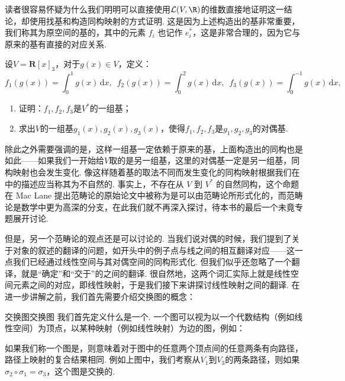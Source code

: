 读者很容易怀疑为什么我们明明可以直接使用$\mathcal{L}(V, \R)$的维数直接地证明这一结论，却使用找基和构造同构映射的方式证明. 这是因为上述构造出的基非常重要，我们称其为原空间的基的，其中的元素 $f_i$ 也记作 $e^*_i$，这是非常合理的，因为它与原来的基有直接的对应关系.

\begin{example}{}{}
    设$V=\mathbf{R}[x]_3$，对于$g(x)\in V$，定义：
    \[f_1(g(x))=\displaystyle\int_0^1g(x)\,\mathrm{d}x,\enspace f_2(g(x))=\int_0^2g(x)\,\mathrm{d}x,\enspace f_3(g(x))=\int_0^{-1}g(x)\,\mathrm{d}x,\]
    \begin{enumerate}
        \item 证明：$f_1,f_2,f_3$是$V^*$的一组基；

        \item 求出$V$的一组基$g_1(x),g_2(x),g_3(x)$，使得$f_1,f_2,f_3$是$g_1,g_2,g_3$的对偶基.
    \end{enumerate}
\end{example}

\begin{solution}

\end{solution}

除此之外需要强调的是，这样一组基一定依赖于原来的基，上面构造出的同构也是如此——如果我们一开始给$V$取的是另一组基，这里的对偶基一定是另一组基，同构映射也会发生变化. 像这样随着基的取法不同而发生变化的同构映射根据我们在中的描述应当称其为不自然的. 事实上，不存在从 $V$ 到 $V^*$ 的自然同构，这个命题在 Mac Lane 提出范畴论的原始论文中被称为是可以由范畴论所形式化的，而范畴论是数学中更为高深的分支，在此我们就不再深入探讨，待本书的最后一个未竟专题展开讨论.

但是，另一个范畴论的观点还是可以讨论的. 当我们说对偶的时候，我们提到了关于对象的叙述的翻译的问题，如开头中的例子点与线之间的相互翻译对应——这一点我们已经通过线性空间与其对偶空间的同构形式化. 但我们似乎还忽略了一个翻译，就是``确定''和``交于''的之间的翻译. 很自然地，这两个词汇实际上就是线性空间元素之间的对应，即线性映射，于是我们接下来讲探讨线性映射之间的翻译. 在进一步讲解之前，我们首先需要介绍交换图的概念：
\begin{definition}{交换图}{交换图}
    我们首先定义什么是一个. 一个图可以视为以一个代数结构（例如线性空间）为顶点，以某种映射（例如线性映射）为边的图，例如：
    \begin{center}
    \end{center}
    如果我们称一个图是，则意味着对于图中的任意两个顶点间的任意两条有向路径，路径上映射的复合结果相同. 例如上图中，我们考察从$V_1$到$V_3$的两条路径，则如果$\sigma_2\circ\sigma_1=\sigma_3$，这个图是交换的.
\end{definition}

